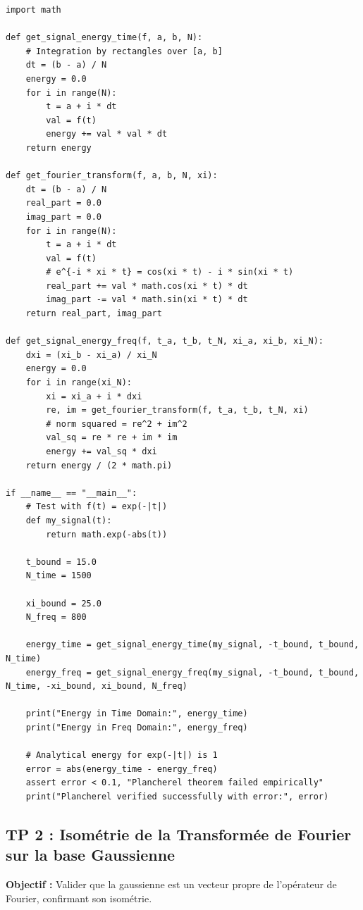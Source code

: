 \documentclass[11pt,a4paper]{article}
\begin{document}
\begin{lstlisting}
import math

def get_signal_energy_time(f, a, b, N):
    # Integration by rectangles over [a, b]
    dt = (b - a) / N
    energy = 0.0
    for i in range(N):
        t = a + i * dt
        val = f(t)
        energy += val * val * dt
    return energy

def get_fourier_transform(f, a, b, N, xi):
    dt = (b - a) / N
    real_part = 0.0
    imag_part = 0.0
    for i in range(N):
        t = a + i * dt
        val = f(t)
        # e^{-i * xi * t} = cos(xi * t) - i * sin(xi * t)
        real_part += val * math.cos(xi * t) * dt
        imag_part -= val * math.sin(xi * t) * dt
    return real_part, imag_part

def get_signal_energy_freq(f, t_a, t_b, t_N, xi_a, xi_b, xi_N):
    dxi = (xi_b - xi_a) / xi_N
    energy = 0.0
    for i in range(xi_N):
        xi = xi_a + i * dxi
        re, im = get_fourier_transform(f, t_a, t_b, t_N, xi)
        # norm squared = re^2 + im^2
        val_sq = re * re + im * im
        energy += val_sq * dxi
    return energy / (2 * math.pi)

if __name__ == "__main__":
    # Test with f(t) = exp(-|t|)
    def my_signal(t):
        return math.exp(-abs(t))

    t_bound = 15.0
    N_time = 1500

    xi_bound = 25.0
    N_freq = 800

    energy_time = get_signal_energy_time(my_signal, -t_bound, t_bound, N_time)
    energy_freq = get_signal_energy_freq(my_signal, -t_bound, t_bound, N_time, -xi_bound, xi_bound, N_freq)

    print("Energy in Time Domain:", energy_time)
    print("Energy in Freq Domain:", energy_freq)

    # Analytical energy for exp(-|t|) is 1
    error = abs(energy_time - energy_freq)
    assert error < 0.1, "Plancherel theorem failed empirically"
    print("Plancherel verified successfully with error:", error)
\end{lstlisting}



\subsection*{TP 2 : Isométrie de la Transformée de Fourier sur la base Gaussienne}

\textbf{Objectif :} Valider que la gaussienne est un vecteur propre de l'opérateur de Fourier, confirmant son isométrie.
\end{document}
